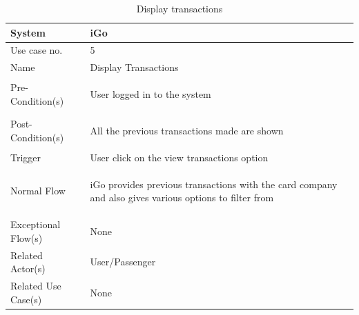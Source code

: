 \documentclass{article}
\begin{document}
\begin{table}[ht]
    \centering
    \begin{tabular}{|l|p{11cm}|}
         \hline
         System& iGo\\
         \hline
         Use case no. & 5 \\
         \hline
         Name & Display Transactions \\
         \hline
         Pre-Condition(s)   & 
         \begin{enumerate*}[itemjoin=\newline]
             \item User logged in to the system
         \end{enumerate*} \\
         \hline
         Post-Condition(s)  & 
         \begin{enumerate*}[itemjoin=\newline]
             \item All the previous transactions made are shown
         \end{enumerate*} \\
         \hline
         Trigger& User click on the view transactions option \\
         \hline
         Normal Flow        & 
         \begin{enumerate*}[itemjoin=\newline]
             \item iGo provides previous transactions with the card company and also gives various options to filter from   
         \end{enumerate*} \\
         \hline
         Exceptional Flow(s)& None\\
         \hline
         Related Actor(s)   & User/Passenger\\
         \hline
         Related Use Case(s)& None\\
         \hline
    \end{tabular}
    \caption{Display transactions}
    \label{tab:UC_transactions}
\end{table}
\end{document}
